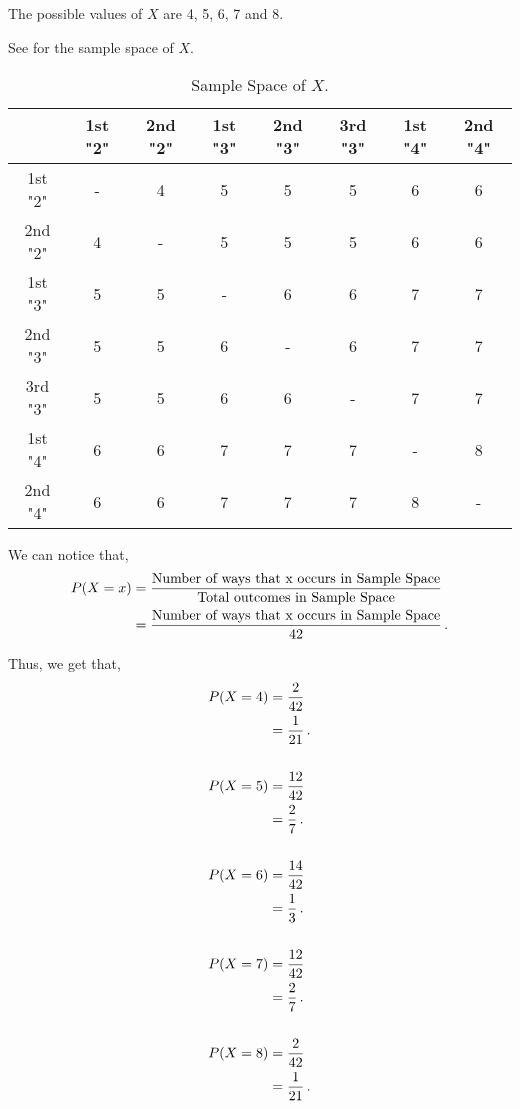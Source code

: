 \begin{subquestions}
\begin{subsubquestions}
\subsubquestion

The possible values of $X$ are 4, 5, 6, 7 and 8.


\subsubquestion

See  for the sample space of $X$.

\begin{table}[H]
	\centering
	\begin{tabular}{|c|c|c|c|c|c|c|c|}	
	\hline
	  & 1st "2" & 2nd "2" & 1st "3" & 2nd "3" & 3rd "3" & 1st "4" & 2nd "4" \\
	\hline 
	1st "2" & - & 4 & 5 & 5 & 5 & 6 & 6 \\
	\hline
	2nd "2" & 4 & - & 5 & 5 & 5 & 6 & 6 \\
	\hline
	1st "3" & 5 & 5 & - & 6 & 6 & 7 & 7 \\
	\hline
	2nd "3" & 5 & 5 & 6 & - & 6 & 7 & 7  \\
	\hline
	3rd "3" & 5 & 5 & 6 & 6 & - & 7 & 7 \\
	\hline
	1st "4" & 6 & 6 & 7 & 7 & 7 & - & 8  \\
	\hline
	2nd "4" & 6 & 6 & 7 & 7 & 7 & 8 & -  \\
	\hline	
	\end{tabular}
	\caption{\label{2012:q4:Sample} Sample Space of $X$.}
\end{table}

We can notice that,
\begin{align}
	P(X=x) & = \frac{\text{Number of ways that x occurs in Sample Space}}{\text{Total outcomes in Sample Space}} \nonumber \\
	       & = \frac{\text{Number of ways that x occurs in Sample Space}}{42}\,.	
\end{align}

Thus, we get that,
\begin{align}
	P(X=4) & = \frac{2}{42} \nonumber \\
	       & = \frac{1}{21} \,. \\ \nonumber \\
	P(X=5) & = \frac{12}{42} \nonumber \\
	       & = \frac{2}{7} \,.	\\ \nonumber \\
	P(X=6) & = \frac{14}{42} \nonumber \\
	       & = \frac{1}{3} \,. \\ \nonumber \\
	P(X=7) & = \frac{12}{42} \nonumber \\
		   & = \frac{2}{7} \,.\\ \nonumber \\
	P(X=8) & = \frac{2}{42} \nonumber \\
		   & = \frac{1}{21} \,.	   
\end{align}


\end{subsubquestions}
\end{subquestions}
